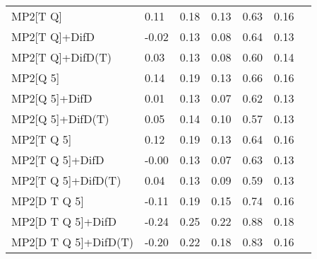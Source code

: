 \begin{table}
\begin{tabular}{l l l l l l l }
    MP2[T Q] & 0.11 & 0.18 & 0.13 & 0.63 & 0.16 \\ 
    MP2[T Q]+DifD & -0.02 & 0.13 & 0.08 & 0.64 & 0.13 \\ 
    MP2[T Q]+DifD(T) & 0.03 & 0.13 & 0.08 & 0.60 & 0.14 \\ 
    MP2[Q 5] & 0.14 & 0.19 & 0.13 & 0.66 & 0.16 \\ 
    MP2[Q 5]+DifD & 0.01 & 0.13 & 0.07 & 0.62 & 0.13 \\ 
    MP2[Q 5]+DifD(T) & 0.05 & 0.14 & 0.10 & 0.57 & 0.13 \\ 
    MP2[T Q 5] & 0.12 & 0.19 & 0.13 & 0.64 & 0.16 \\ 
    MP2[T Q 5]+DifD & -0.00 & 0.13 & 0.07 & 0.63 & 0.13 \\ 
    MP2[T Q 5]+DifD(T) & 0.04 & 0.13 & 0.09 & 0.59 & 0.13 \\ 
    MP2[D T Q 5] & -0.11 & 0.19 & 0.15 & 0.74 & 0.16 \\ 
    MP2[D T Q 5]+DifD & -0.24 & 0.25 & 0.22 & 0.88 & 0.18 \\ 
    MP2[D T Q 5]+DifD(T) & -0.20 & 0.22 & 0.18 & 0.83 & 0.16 \\ 
    \hline
  \end{tabular}
\end{table}
